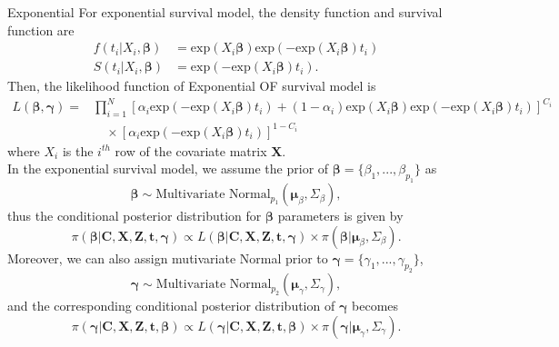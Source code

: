 \documentclass[a4paper, 12pt]{article}
\makeatletter
\newcommand {\dprod}{\displaystyle \prod}
\renewcommand{\subsection}{\@startsection
	{subsection}    {2}    {0mm}    {-0.5\baselineskip}    {0.01\baselineskip}    {\normalfont\normalsize\itshape\center}}
\makeatother
\begin{document}
\subsection{Exponential}
\noindent 
For exponential survival model, the density function and survival function are
\begin{equation}
\begin{aligned}
f(t_i|X_i, \mathbf{\beta}) &= \mbox{exp}(X_i\mathbf{\beta})\mbox{exp}(- \mbox{exp}(X_i\mathbf{\beta})t_i)\\
S(t_i|X_i, \mathbf{\beta}) &= \mbox{exp}(- \mbox{exp}(X_i\mathbf{\beta})t_i).
\end{aligned}
\end{equation}
Then, the likelihood function of Exponential OF survival model is
\begin{equation}
\begin{aligned}
L(\mathbf{\beta}, \mathbf{\gamma})=&\dprod\limits_{i=1}^{N}[\alpha _{i}\mbox{exp}(- \mbox{exp}(X_i\mathbf{\beta})t_i)+(1-\alpha _{i})\mbox{exp}(X_i\mathbf{\beta})\mbox{exp}(- \mbox{exp}(X_i\mathbf{\beta})t_i)]^{C_{i}}\\&\quad \times[\alpha _{i}\mbox{exp}(- \mbox{exp}(X_i\mathbf{\beta})t_i)]^{1-C_{i}}
\end{aligned}
\end{equation}
where $X_i$ is the $i^{th}$ row of the covariate matrix $\mathbf{X}$.\\ \newline
In the exponential survival model, we assume the prior of $\mathbf{\beta}=\{\beta_1,...,\beta_{p_1}\}$ as
\begin{equation}
\mathbf{\beta} \sim \mbox{Multivariate Normal}_{p_1}(\mathbf{\mu}_{\beta}, \Sigma_{\beta}),
\end{equation}
thus the conditional posterior distribution for $\mathbf{\beta}$ parameters is given by
\begin{equation}
\pi(\mathbf{\beta}|\mathbf{C}, \mathbf{X}, \mathbf{Z}, \mathbf{t}, \mathbf{\gamma}) \propto L(\mathbf{\beta}|\mathbf{C}, \mathbf{X}, \mathbf{Z}, \mathbf{t}, \mathbf{\gamma})\times \pi(\mathbf{\beta}|\mathbf{\mu}_{\beta}, \Sigma_{\beta}).
\end{equation}
Moreover, we can also assign mutivariate Normal prior to $\mathbf{\gamma}=\{\gamma_1,...,\gamma_{p_2}\}$,
\begin{equation}
\mathbf{\gamma} \sim \mbox{Multivariate Normal}_{p_2}(\mathbf{\mu}_{\gamma}, \Sigma_{\gamma}),
\end{equation}
and the corresponding conditional posterior distribution of $\mathbf{\gamma}$ becomes 
\begin{equation}
\pi(\mathbf{\gamma}|\mathbf{C}, \mathbf{X}, \mathbf{Z}, \mathbf{t}, \mathbf{\beta}) \propto L(\mathbf{\gamma}|\mathbf{C}, \mathbf{X}, \mathbf{Z}, \mathbf{t}, \mathbf{\beta})\times \pi(\mathbf{\gamma}|\mathbf{\mu}_{\gamma}, \Sigma_{\gamma}).
\end{equation}
\end{document}
